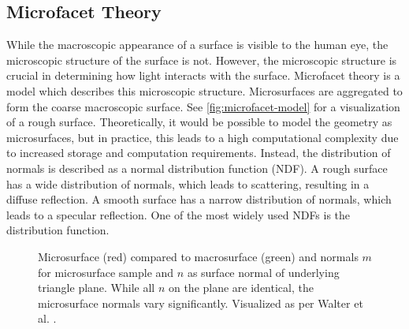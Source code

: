 \subsection*{Microfacet Theory}

While the macroscopic appearance of a surface is visible to the human eye, the microscopic structure of the surface is not. However, the microscopic structure is crucial in determining how light interacts with the surface. Microfacet theory is a model which describes this microscopic structure. Microsurfaces are aggregated to form the coarse macroscopic surface. See \autoref{fig:microfacet-model} for a visualization of a rough surface. Theoretically, it would be possible to model the geometry as microsurfaces, but in practice, this leads to a high computational complexity due to increased storage and computation requirements. Instead, the distribution of normals is described as a normal distribution function (\gls{NDF}). A rough surface has a wide distribution of normals, which leads to scattering, resulting in a diffuse reflection. A smooth surface has a narrow distribution of normals, which leads to a specular reflection. One of the most widely used \glspl{NDF} is the  distribution function. \cite{Pharr_Physically_Based_Rendering_2023}

\begin{figure}[H]
  \centering
  \caption{Microsurface (red) compared to macrosurface (green) and normals $m$ for microsurface sample and $n$ as surface normal of underlying triangle plane. While all $n$ on the plane are identical, the microsurface normals vary significantly. Visualized as per Walter et al. \cite{walter2007microfacet}.}
  \label{fig:microfacet-model}
\end{figure}

